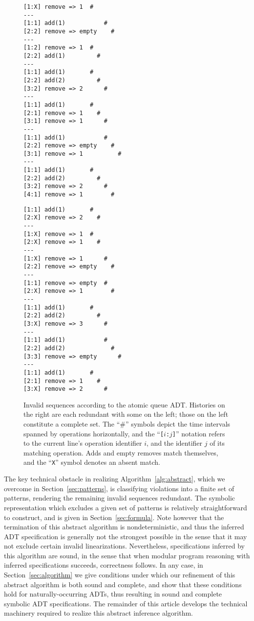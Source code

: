 \begin{figure}[t]
  \begin{minipage}[b]{0.49\linewidth}
    \begin{verbatim}
[1:X] remove => 1  #
---
[1:1] add(1)           #
[2:2] remove => empty    #
---
[1:2] remove => 1  #
[2:2] add(1)         #
---
[1:1] add(1)       #
[2:2] add(2)         #
[3:2] remove => 2      #
---
[1:1] add(1)       #
[2:1] remove => 1    #
[3:1] remove => 1      #
---
[1:1] add(1)           #
[2:2] remove => empty    #
[3:1] remove => 1          #
---
[1:1] add(1)       #
[2:2] add(2)         #
[3:2] remove => 2      #
[4:1] remove => 1        #
    \end{verbatim}
  \end{minipage}
  \hfill
  \begin{minipage}[b]{0.49\linewidth}
    \begin{verbatim}
[1:1] add(1)       #
[2:X] remove => 2    #
---
[1:X] remove => 1  #
[2:X] remove => 1    #
---
[1:X] remove => 1      #
[2:2] remove => empty    #
---
[1:1] remove => empty  #
[2:X] remove => 1        #
---
[1:1] add(1)       #
[2:2] add(2)         #
[3:X] remove => 3      #
---
[1:1] add(1)           #
[2:2] add(2)             #
[3:3] remove => empty      #
---
[1:1] add(1)       #
[2:1] remove => 1    #
[3:X] remove => 2      #
    \end{verbatim}
  \end{minipage}
  \caption{Invalid sequences according to the atomic queue ADT. Histories
  on the right are each redundant with some on the left; those on
  the left constitute a complete set. The “\#” symbols depict the time intervals
  spanned by operations horizontally, and the “{\tt [$i$:$j$]}” notation refers
  to the current line’s operation identifier $i$, and the identifier $j$ of
  its matching operation. Adds and empty removes match themselves, and the
  “{\tt X}” symbol denotes an absent match.}
  \label{fig:patterns}
\end{figure}

The key technical obstacle in realizing Algorithm~\ref{alg:abstract},
which we overcome in Section~\ref{sec:patterns}, is
classifying violations into a finite set of patterns, rendering the
remaining invalid sequences redundant. The symbolic representation which
excludes a given set of patterns is relatively straightforward to construct, and
is given in Section~\ref{sec:formula}. Note however that the termination of this
abstract algorithm is nondeterministic, and thus the inferred ADT specification
is generally not the strongest possible in the sense that it may not exclude
certain invalid linearizations. Nevertheless, specifications inferred by this
algorithm are sound, in the sense that when modular program reasoning with
inferred specifications succeeds, correctness follows. In any case, in
Section~\ref{sec:algorithm} we give conditions under which our refinement
of this abstract algorithm is both sound and complete, and show that these
conditions hold for naturally-occurring ADTs, thus resulting in sound and
complete symbolic ADT specifications. The remainder of this article develops
the technical machinery required to realize this abstract inference algorithm.
